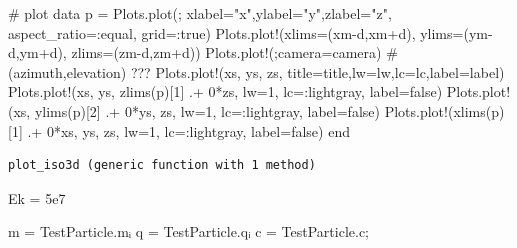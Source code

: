 \documentclass[
  a4paper,
  DIV=11]{scrreprt}
\newenvironment{Shaded}{\begin{snugshade}}{\end{snugshade}}
\newcommand{\CommentTok}[1]{\textcolor[rgb]{0.37,0.37,0.37}{#1}}
\newcommand{\ConstantTok}[1]{\textcolor[rgb]{0.56,0.35,0.01}{#1}}
\newcommand{\FloatTok}[1]{\textcolor[rgb]{0.68,0.00,0.00}{#1}}
\newcommand{\FunctionTok}[1]{\textcolor[rgb]{0.28,0.35,0.67}{#1}}
\newcommand{\KeywordTok}[1]{\textcolor[rgb]{0.00,0.23,0.31}{#1}}
\newcommand{\NormalTok}[1]{\textcolor[rgb]{0.00,0.23,0.31}{#1}}
\newcommand{\OperatorTok}[1]{\textcolor[rgb]{0.37,0.37,0.37}{#1}}
\newcommand{\StringTok}[1]{\textcolor[rgb]{0.13,0.47,0.30}{#1}}
\begin{document}
\begin{Shaded}
\begin{Highlighting}[]
    \CommentTok{\# plot data}
\NormalTok{    p }\OperatorTok{=}\NormalTok{ Plots.}\FunctionTok{plot}\NormalTok{(; xlabel}\OperatorTok{=}\StringTok{"x"}\NormalTok{,ylabel}\OperatorTok{=}\StringTok{"y"}\NormalTok{,zlabel}\OperatorTok{=}\StringTok{"z"}\NormalTok{, aspect\_ratio}\OperatorTok{=:}\NormalTok{equal, grid}\OperatorTok{=:}\ConstantTok{true}\NormalTok{)}
\NormalTok{    Plots.}\FunctionTok{plot!}\NormalTok{(xlims}\OperatorTok{=}\NormalTok{(xm}\OperatorTok{{-}}\NormalTok{d,xm}\OperatorTok{+}\NormalTok{d), ylims}\OperatorTok{=}\NormalTok{(ym}\OperatorTok{{-}}\NormalTok{d,ym}\OperatorTok{+}\NormalTok{d), zlims}\OperatorTok{=}\NormalTok{(zm}\OperatorTok{{-}}\NormalTok{d,zm}\OperatorTok{+}\NormalTok{d))}
\NormalTok{    Plots.}\FunctionTok{plot!}\NormalTok{(;camera}\OperatorTok{=}\NormalTok{camera)    }\CommentTok{\#(azimuth,elevation) ???}
\NormalTok{    Plots.}\FunctionTok{plot!}\NormalTok{(xs, ys, zs, title}\OperatorTok{=}\NormalTok{title,lw}\OperatorTok{=}\NormalTok{lw,lc}\OperatorTok{=}\NormalTok{lc,label}\OperatorTok{=}\NormalTok{label)}
\NormalTok{    Plots.}\FunctionTok{plot!}\NormalTok{(xs, ys, }\FunctionTok{zlims}\NormalTok{(p)[}\FloatTok{1}\NormalTok{] }\OperatorTok{.+} \FloatTok{0}\OperatorTok{*}\NormalTok{zs, lw}\OperatorTok{=}\FloatTok{1}\NormalTok{, lc}\OperatorTok{=:}\NormalTok{lightgray, label}\OperatorTok{=}\ConstantTok{false}\NormalTok{)}
\NormalTok{    Plots.}\FunctionTok{plot!}\NormalTok{(xs, }\FunctionTok{ylims}\NormalTok{(p)[}\FloatTok{2}\NormalTok{]  }\OperatorTok{.+} \FloatTok{0}\OperatorTok{*}\NormalTok{ys, zs, lw}\OperatorTok{=}\FloatTok{1}\NormalTok{, lc}\OperatorTok{=:}\NormalTok{lightgray, label}\OperatorTok{=}\ConstantTok{false}\NormalTok{)}
\NormalTok{    Plots.}\FunctionTok{plot!}\NormalTok{(}\FunctionTok{xlims}\NormalTok{(p)[}\FloatTok{1}\NormalTok{]  }\OperatorTok{.+} \FloatTok{0}\OperatorTok{*}\NormalTok{xs, ys, zs, lw}\OperatorTok{=}\FloatTok{1}\NormalTok{, lc}\OperatorTok{=:}\NormalTok{lightgray, label}\OperatorTok{=}\ConstantTok{false}\NormalTok{)}
\KeywordTok{end}
\end{Highlighting}
\end{Shaded}

\begin{verbatim}
plot_iso3d (generic function with 1 method)
\end{verbatim}

\begin{Shaded}
\begin{Highlighting}[]
\NormalTok{Ek }\OperatorTok{=} \FloatTok{5e7}

\NormalTok{m }\OperatorTok{=}\NormalTok{ TestParticle.mᵢ}
\NormalTok{q }\OperatorTok{=}\NormalTok{ TestParticle.qᵢ}
\NormalTok{c }\OperatorTok{=}\NormalTok{ TestParticle.c;}
\end{Highlighting}
\end{Shaded}
\end{document}
